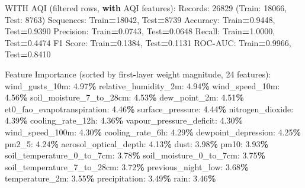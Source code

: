 \documentclass[
  letterpaper,
  DIV=11,
  numbers=noendperiod]{scrartcl}
\newenvironment{Shaded}{\begin{snugshade}}{\end{snugshade}}
\newcommand{\BuiltInTok}[1]{#1}
\newcommand{\ControlFlowTok}[1]{\textcolor[rgb]{0.13,0.29,0.53}{\textbf{#1}}}
\newcommand{\DecValTok}[1]{\textcolor[rgb]{0.00,0.00,0.81}{#1}}
\newcommand{\FloatTok}[1]{\textcolor[rgb]{0.00,0.00,0.81}{#1}}
\newcommand{\NormalTok}[1]{#1}
\newcommand{\OperatorTok}[1]{\textcolor[rgb]{0.81,0.36,0.00}{\textbf{#1}}}
\begin{document}
\begin{Shaded}
\begin{Highlighting}[]
\NormalTok{WITH AQI (filtered rows, }\ControlFlowTok{with}\NormalTok{ AQI features):}
\NormalTok{  Records: }\DecValTok{26829}\NormalTok{ (Train: }\DecValTok{18066}\NormalTok{, Test: }\DecValTok{8763}\NormalTok{)}
\NormalTok{  Sequences: Train}\OperatorTok{=}\DecValTok{18042}\NormalTok{, Test}\OperatorTok{=}\DecValTok{8739}
\NormalTok{  Accuracy: Train}\OperatorTok{=}\FloatTok{0.9448}\NormalTok{, Test}\OperatorTok{=}\FloatTok{0.9390}
\NormalTok{  Precision: Train}\OperatorTok{=}\FloatTok{0.0743}\NormalTok{, Test}\OperatorTok{=}\FloatTok{0.0648}
\NormalTok{  Recall: Train}\OperatorTok{=}\FloatTok{1.0000}\NormalTok{, Test}\OperatorTok{=}\FloatTok{0.4474}
\NormalTok{  F1 Score: Train}\OperatorTok{=}\FloatTok{0.1384}\NormalTok{, Test}\OperatorTok{=}\FloatTok{0.1131}
\NormalTok{  ROC}\OperatorTok{{-}}\NormalTok{AUC: Train}\OperatorTok{=}\FloatTok{0.9966}\NormalTok{, Test}\OperatorTok{=}\FloatTok{0.8410}

\NormalTok{  Feature Importance (}\BuiltInTok{sorted}\NormalTok{ by first}\OperatorTok{{-}}\NormalTok{layer weight magnitude, }\DecValTok{24}\NormalTok{ features):}
\NormalTok{    wind\_gusts\_10m: }\FloatTok{4.97}\OperatorTok{\%}
\NormalTok{    relative\_humidity\_2m: }\FloatTok{4.94}\OperatorTok{\%}
\NormalTok{    wind\_speed\_10m: }\FloatTok{4.56}\OperatorTok{\%}
\NormalTok{    soil\_moisture\_7\_to\_28cm: }\FloatTok{4.53}\OperatorTok{\%}
\NormalTok{    dew\_point\_2m: }\FloatTok{4.51}\OperatorTok{\%}
\NormalTok{    et0\_fao\_evapotranspiration: }\FloatTok{4.46}\OperatorTok{\%}
\NormalTok{    surface\_pressure: }\FloatTok{4.44}\OperatorTok{\%}
\NormalTok{    nitrogen\_dioxide: }\FloatTok{4.39}\OperatorTok{\%}
\NormalTok{    cooling\_rate\_12h: }\FloatTok{4.36}\OperatorTok{\%}
\NormalTok{    vapour\_pressure\_deficit: }\FloatTok{4.30}\OperatorTok{\%}
\NormalTok{    wind\_speed\_100m: }\FloatTok{4.30}\OperatorTok{\%}
\NormalTok{    cooling\_rate\_6h: }\FloatTok{4.29}\OperatorTok{\%}
\NormalTok{    dewpoint\_depression: }\FloatTok{4.25}\OperatorTok{\%}
\NormalTok{    pm2\_5: }\FloatTok{4.24}\OperatorTok{\%}
\NormalTok{    aerosol\_optical\_depth: }\FloatTok{4.13}\OperatorTok{\%}
\NormalTok{    dust: }\FloatTok{3.98}\OperatorTok{\%}
\NormalTok{    pm10: }\FloatTok{3.93}\OperatorTok{\%}
\NormalTok{    soil\_temperature\_0\_to\_7cm: }\FloatTok{3.78}\OperatorTok{\%}
\NormalTok{    soil\_moisture\_0\_to\_7cm: }\FloatTok{3.75}\OperatorTok{\%}
\NormalTok{    soil\_temperature\_7\_to\_28cm: }\FloatTok{3.72}\OperatorTok{\%}
\NormalTok{    previous\_night\_low: }\FloatTok{3.68}\OperatorTok{\%}
\NormalTok{    temperature\_2m: }\FloatTok{3.55}\OperatorTok{\%}
\NormalTok{    precipitation: }\FloatTok{3.49}\OperatorTok{\%}
\NormalTok{    rain: }\FloatTok{3.46}\OperatorTok{\%}


\end{Highlighting}
\end{Shaded}
\end{document}
